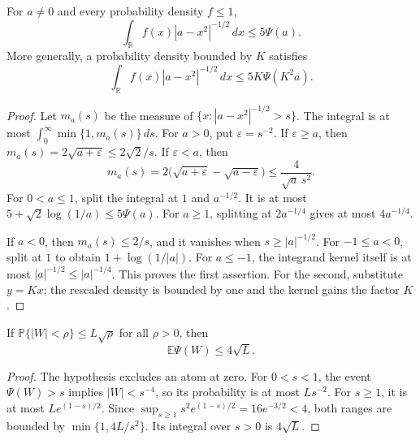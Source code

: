 \begin{lemma}
\label{rt:kernel}
For \(a\ne0\) and every probability density \(f\leq1\),
\[
 \int_{\mathbb R}f(x)|a-x^2|^{-1/2}\,dx\leq5\Psi(a).
\]
More generally, a probability density bounded by \(K\)
satisfies
\[
 \int_{\mathbb R}f(x)|a-x^2|^{-1/2}\,dx
 \leq5K\Psi(K^2a).
\]
\end{lemma}
\begin{proof}
Let \(m_a(s)\) be the measure of
\(\{x:|a-x^2|^{-1/2}>s\}\).
The integral is at most
\(\int_0^\infty\min\{1,m_a(s)\}\,ds\).
For \(a>0\), put \(\varepsilon=s^{-2}\).
If \(\varepsilon\geq a\), then
\(m_a(s)=2\sqrt{a+\varepsilon}\leq2\sqrt2/s\).
If \(\varepsilon<a\), then
\[
 m_a(s)
 =2\bigl(\sqrt{a+\varepsilon}-\sqrt{a-\varepsilon}\bigr)
 \leq\frac4{\sqrt a\,s^2}.
\]
For \(0<a\leq1\), split the integral at \(1\) and
\(a^{-1/2}\).  It is at most
\(5+\sqrt2\log(1/a)\leq5\Psi(a)\).
For \(a\geq1\), splitting at \(2a^{-1/4}\) gives
at most \(4a^{-1/4}\).

If \(a<0\), then \(m_a(s)\leq2/s\), and it vanishes
when \(s\geq|a|^{-1/2}\).
For \(-1\leq a<0\), split at \(1\) to obtain
\(1+\log(1/|a|)\).  For \(a\leq-1\), the integrand
kernel itself is at most \(|a|^{-1/2}\leq|a|^{-1/4}\).
This proves the first assertion.  For the second,
substitute \(y=Kx\); the rescaled density is bounded
by one and the kernel gains the factor \(K\).
\end{proof}

\begin{lemma}
\label{rt:kernel-average}
If \(\mathbb P\{|W|<\rho\}\leq L\sqrt\rho\) for all
\(\rho>0\), then
\[
 \mathbb E\Psi(W)\leq4\sqrt L.
\]
\end{lemma}
\begin{proof}
The hypothesis excludes an atom at zero.
For \(0<s<1\), the event \(\Psi(W)>s\) implies
\(|W|<s^{-4}\), so its probability is at most \(Ls^{-2}\).
For \(s\geq1\), it is at most \(Le^{(1-s)/2}\).
Since
\(\sup_{s\geq1}s^2e^{(1-s)/2}=16e^{-3/2}<4\),
both ranges are bounded by \(\min\{1,4L/s^2\}\).
Its integral over \(s>0\) is \(4\sqrt L\).
\end{proof}


